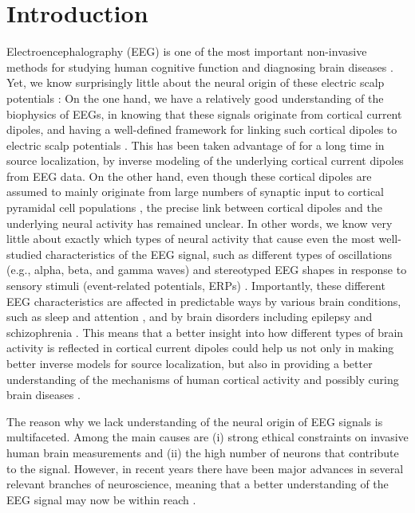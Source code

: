 \documentclass[preprint,10pt,authoryear]{elsarticle}
\begin{document}
\section{Introduction}\label{sec:introduction}

Electroencephalography (EEG) is one of the most important non-invasive methods for studying human cognitive function and diagnosing brain diseases \citep{COHEN2017, Pesaran2018}.  Yet, we know surprisingly little about the neural origin of these electric scalp potentials \citep{COHEN2017}: On the one hand, we have a relatively good understanding of the biophysics of EEGs, in knowing that these signals originate from cortical current dipoles, and having a well-defined framework for linking such cortical dipoles to electric scalp potentials \citep{NUNEZ2006}. This has been taken advantage of for a long time in source localization, by inverse modeling of the underlying cortical current dipoles from EEG data. On the other hand, even though these cortical dipoles are assumed to mainly originate from
large numbers of synaptic input to cortical pyramidal cell populations \citep{NUNEZ2006, SILVA2013, Pesaran2018, Ilmoniemi2019},
the precise link between cortical dipoles and the underlying neural activity has remained unclear. In other words, we know very little about exactly which types of neural activity that cause even the most well-studied characteristics of the EEG signal, such as different types of oscillations (e.g., alpha, beta, and gamma waves) and stereotyped EEG shapes in response to sensory stimuli (event-related potentials, ERPs) \citep{COHEN2017}. Importantly, these different EEG characteristics are affected in predictable ways by various brain conditions, such as sleep and attention \citep{Klimesch1998, Palva2011, Siegel2012}, and by brain disorders including epilepsy and schizophrenia \citep{Niedermeyer2003, Light2013, Freestone2015, MAKI2019}. 
This means that a better insight into how different types of brain activity is reflected in cortical current dipoles could help us not only in making better inverse models for source localization, but also in providing a better understanding of the mechanisms of human cortical activity and possibly curing brain diseases  \citep{Uhlirova2016, COHEN2017, MAKI2019}.

The reason why we lack understanding of the neural origin of EEG signals is multifaceted. Among the main causes are (i) strong ethical constraints on invasive human brain measurements and (ii) the high number of neurons that contribute to the signal. However, in recent years there have been major advances in several relevant branches of neuroscience, meaning that a better understanding of the EEG signal may now be within reach \citep{Uhlirova2016, COHEN2017}.
\end{document}
